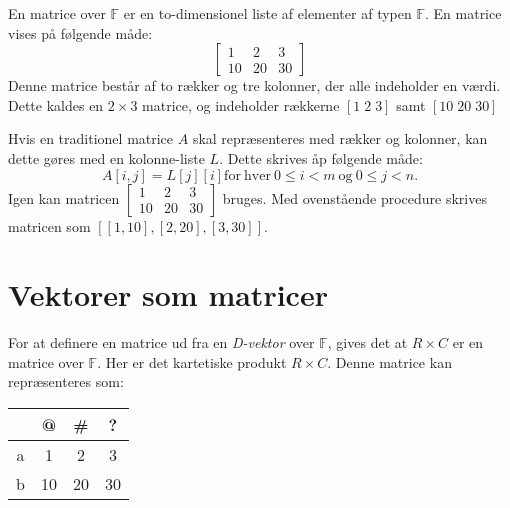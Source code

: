 En matrice over $\mathbb{F}$ er en to-dimensionel liste af elementer af typen $\mathbb{F}$. En matrice vises på følgende måde:
$$\left[
\begin{matrix}
    1&2&3\\
    10&20&30
\end{matrix}
\right]
$$
Denne matrice består af to rækker og tre kolonner, der alle indeholder en værdi. Dette kaldes en $2 \times 3$ matrice, og indeholder rækkerne $[1\;2\;3]$ samt $[10\;20\;30]$

Hvis en traditionel matrice $A$ skal repræsenteres med rækker og kolonner, kan dette gøres med en kolonne-liste $L$. Dette skrives åp følgende måde:
\begin{equation}
    A\left[i,j\right] = L\left[j\right]\left[i\right]\mathrm{for\ hver\ }0\leq i<m\mathrm{\ og\ }0\leq j<n.
\end{equation}
Igen kan matricen $\left[\begin{matrix}1&2&3\\10&20&30\end{matrix}\right]$ bruges. Med ovenstående procedure skrives matricen som $[[1,10],[2,20],[3,30]]$.

\section{Vektorer som matricer}
For at definere en matrice ud fra en \textit{D-vektor} over $\mathbb{F}$, gives det at $R\times C$ er en matrice over $\mathbb{F}$. Her er det kartetiske produkt $R\times C$.
Denne matrice kan repræsenteres som:

    \begin{table}
        \begin{tabular}{c|ccc}
             & @ & \# & ?\\\hline
             a&1&2&3\\
             b&10&20&30
        \end{tabular}
    \end{table}



